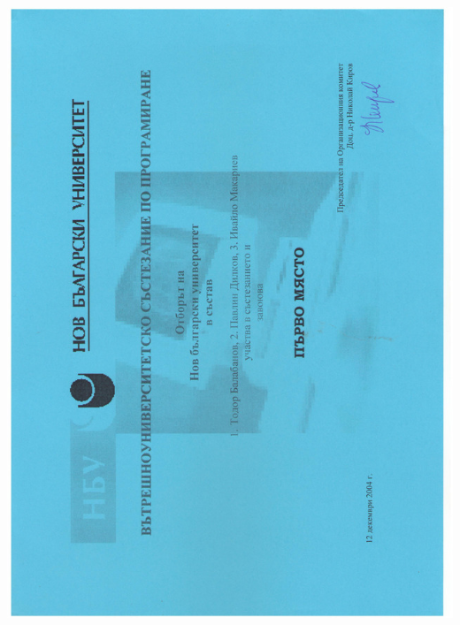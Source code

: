 \documentclass[bulgarian,a4paper]{europasscv}
\begin{document}
\includegraphics[width=\textwidth,height=\textheight,keepaspectratio]{NBU2004}
\end{document}
